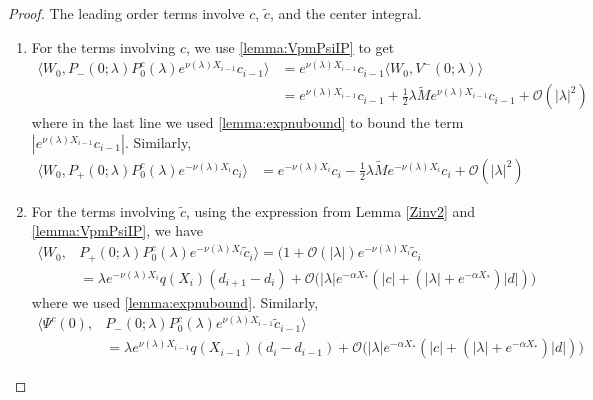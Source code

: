 \documentclass[thesis.tex]{subfiles}
\begin{document}
\begin{lemma}
\begin{proof}
The leading order terms involve $c$, $\tilde{c}$, and the center integral. 
\begin{enumerate}

\item For the terms involving $c$, we use \cref{lemma:VpmPsiIP} to get
\begin{align*}
\langle W_0, P_-(0; \lambda)P_0^c(\lambda) e^{\nu(\lambda) X_{i-1}} c_{i-1} \rangle &= e^{\nu(\lambda) X_{i-1}} c_{i-1} \langle W_0, V^-(0; \lambda) \rangle \\
&= e^{\nu(\lambda) X_{i-1}} c_{i-1} + \frac{1}{2} \lambda \tilde{M} e^{\nu(\lambda) X_{i-1}} c_{i-1} + \mathcal{O}(|\lambda|^2)
\end{align*}
where in the last line we used \cref{lemma:expnubound} to bound the term $|e^{\nu(\lambda) X_{i-1}} c_{i-1}|$. Similarly,
\begin{align*}
\langle W_0, P_+(0; \lambda) P_0^c(\lambda) e^{-\nu(\lambda) X_i} c_i \rangle &= e^{-\nu(\lambda) X_i} c_i - \frac{1}{2} \lambda \tilde{M} e^{-\nu(\lambda) X_i} c_i + \mathcal{O}(|\lambda|^2)
\end{align*}

\item For the terms involving $\tilde{c}$, using the expression from Lemma \ref{Zinv2} and \cref{lemma:VpmPsiIP}, we have
\begin{align*}
\langle W_0, &P_+(0; \lambda) P_0^c(\lambda) e^{-\nu(\lambda)X_i} \tilde{c}_i \rangle = (1 + \mathcal{O}(|\lambda|) e^{-\nu(\lambda)X_i} \tilde{c}_i \\
&= \lambda e^{-\nu(\lambda)X_i} q(X_i) (d_{i+1} - d_i ) 
+ \mathcal{O}\Big( |\lambda| e^{-\alpha X_*} \left( |c| + (|\lambda| + e^{-\alpha X_*}) |d| \right) \Big)
\end{align*}
where we used \cref{lemma:expnubound}. Similarly,
\begin{align*}
\langle \Psi^c(0), &P_-(0; \lambda)P_0^c(\lambda)  e^{\nu(\lambda) X_{i-1}} \tilde{c}_{i-1} \rangle \\
&= \lambda e^{\nu(\lambda)X_{i-1}} q(X_{i-1}) (d_i - d_{i-1} ) + \mathcal{O}\Big( |\lambda| e^{-\alpha X_*} \left( |c| + (|\lambda| + e^{-\alpha X_*}) |d| \right) \Big)
\end{align*}


\end{enumerate}
\end{proof}
\end{lemma}
\end{document}
